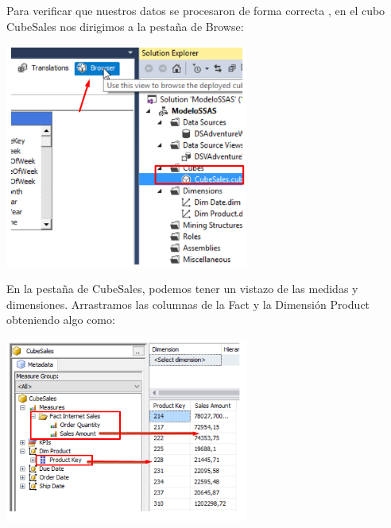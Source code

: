 Para verificar que nuestros datos se procesaron de forma correcta , en el cubo CubeSales nos dirigimos a la
pestaña de Browse:
	\begin{center}
	\includegraphics[width=8cm]{images/task4/img26}
	\end{center}	
En la pestaña de CubeSales, podemos tener un vistazo de las medidas y dimensiones. Arrastramos las
columnas de la Fact y la Dimensión Product obteniendo algo como:
	\begin{center}
	\includegraphics[width=8cm]{images/task4/img27}
	\end{center}	